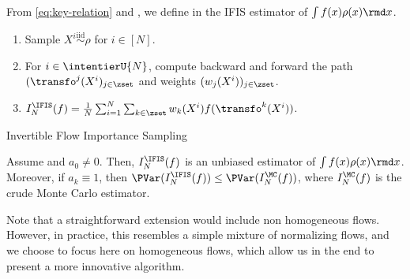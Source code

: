 From \eqref{eq:key-relation} and , we define  in   the IFIS estimator of $\int f(x) \rho(x) \rmd x$.
\begin{algorithm}
\begin{enumerate}[wide, labelwidth=!, labelindent=0pt, label=(\arabic*)]
\item Sample $X^i \overset{\text{iid}}{\sim} \rho$ for $i\in[N]$.
\item For $i \in \intentierU{N}$, compute backward and forward the
  path $(\transfo^j(X^i)_{j \in\zset}$ and weights $(w_j(X^i))_{j \in\zset}$. 
\item$I^{\IFIS}_N(f) =   \tfrac{1}{N} \sum_{i=1}^N \sum_{k\in\zset} w_k(X^i)  f(\transfo^k(X^i))$. 
\end{enumerate}
\caption{Invertible Flow Importance Sampling}
\label{algo:IFIS}
\end{algorithm}
\begin{theorem}
\label{theo:importance-sampling}
Assume  and $a_0 \neq 0$. Then, $I^{\IFIS}_N(f)$ is an unbiased estimator of $\int f(x) \rho(x) \rmd x$. Moreover, if $a_k \equiv 1$, then $\PVar(I_N^{\IFIS}(f)) \leq \PVar(I_N^{\MC}(f))$, where $I_N^{\MC}(f)$ is the crude Monte Carlo estimator. 
\end{theorem}
Note that a straightforward extension would include non homogeneous flows. However, in practice, this resembles a simple mixture of normalizing flows, and we choose to focus here on homogeneous flows, which allow us in the end to present a more innovative algorithm.